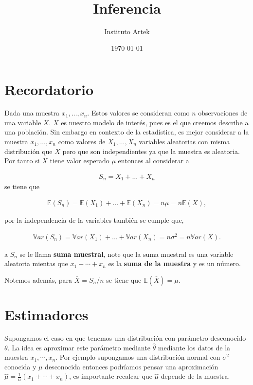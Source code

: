 \documentclass{article}
\title{Inferencia}
\author{Instituto Artek}
\date{\today}
\newcommand{\Esp}{\mathbb{E}}
\newcommand{\Var}{\mathbb{V}ar}
\begin{document}
\maketitle
\tableofcontents
\newpage

\section{Recordatorio}
Dada una muestra $x_1, \dots, x_n$. Estos valores se consideran como $n$ observaciones de una variable $X$. $X$ es nuestro modelo de interés, pues es el que creemos describe a una población. Sin embargo en contexto de la estadística, es mejor considerar a la muestra $x_1, \dots, x_n$ como valores de $X_1, \dots, X_n$ variables aleatorias con misma distribución que $X$ pero que son independientes ya que la muestra es aleatoria. Por tanto si $X$ tiene valor esperado $\mu$ entonces al considerar a 

\begin{align*}
    S_n = X_1 + \dots + X_n
\end{align*}
 se tiene que 

 \begin{align*}
     \Esp(S_n) = \Esp(X_1) + \dots + \Esp (X_n)=n \mu = n \Esp(X),
 \end{align*}
 
por la independencia de la variables también se cumple que, 

 \begin{align*}
     \Var(S_n) = \Var (X_1) + \dots + \Var (X_n)=n \sigma^2= n \Var(X).
 \end{align*}

a $S_n$ se le llama \textbf{suma muestral}, note que la suma muestral es una variable aleatoria mientas que $x_1+ \cdots + x_n$ es la \textbf{suma de la muestra} y es un número.

Notemos además, para $\overline{X}= S_n/n$ se tiene que $\Esp(\overline{X})=\mu$. 
\section{Estimadores}

Supongamos el caso en que tenemos una distribución con parámetro desconocido $\theta$. La idea es aproximar este  parámetro mediante $\hat{\theta}$ mediante los datos de la muestra $x_1, \cdots, x_n$. Por ejemplo supongamos una distribución normal con $\sigma^2$ conocida y $\mu$ desconocida entonces podríamos pensar una aproximación $\hat{\mu}= \frac{1}{n}(x_1 + \cdots +x_n)$, es importante recalcar que $\hat{\mu}$ depende de la muestra. 
\end{document}
